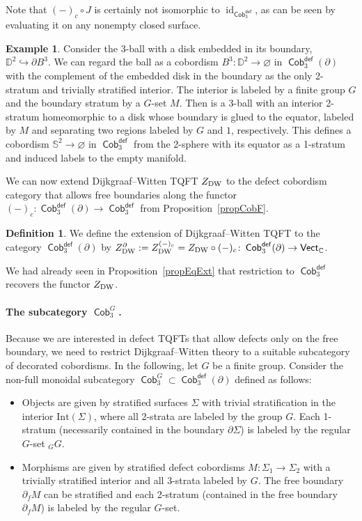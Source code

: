 \documentclass[pdftex]{sigma}
\DeclareMathOperator{\id}{id}
\DeclareMathOperator{\vect}{\mathsf{Vect}}
\DeclareMathOperator{\C}{\mathbb{C}}
\DeclareMathOperator{\Cob}{\mathsf{Cob}}
\numberwithin{equation}{section}
\theoremstyle{definition}
\newtheorem{Definition}[Definition]{Definition}
\newtheorem{Example}[Example]{Example}
\begin{document}
Note that $(-)_c \circ J$ is certainly not isomorphic to $ \id_{\Cob_3^{\mathsf{def}}}$, as can be seen by evaluating it on any nonempty closed surface.
\begin{Example}\label{exCompl}
Consider the 3-ball with a disk embedded in its boundary, $\mathbb{D}^2 \hookrightarrow \partial B^3$. We can regard the ball as a cobordism $B^3\colon \mathbb{D}^2 \rightarrow \varnothing$ in $\Cob_3^{\mathsf{def}}(\partial)$ with the complement of the embedded disk in the boundary as the only 2-stratum and trivially stratified interior. The interior is labeled by a finite group $G$ and the boundary stratum by a $G$-set $M$. Then  is a 3-ball with an interior 2-stratum homeomorphic to a disk whose boundary is glued to the equator, labeled by $M$ and separating two regions labeled by $G$ and $1$, respectively. This defines a cobordism $\mathbb{S}^2 \rightarrow \varnothing$ in $\Cob_3^{\mathsf{def}}$ from the 2-sphere with its equator as a 1-stratum and induced labels to the empty manifold.
\end{Example}

We can now extend Dijkgraaf--Witten TQFT $Z_{\rm DW}$ to the defect cobordism category that allows free boundaries along the functor $(-)_c\colon \Cob_3^{\mathsf{def}}(\partial) \rightarrow \Cob_3^{\mathsf{def}}$ from Proposition~\ref{propCobF}.
\begin{Definition}\label{defExtDW}
We define the extension of Dijkgraaf--Witten TQFT to the category $\Cob_3^{\mathsf{def}}(\partial)$ by $Z_{\rm DW}^{\partial} := Z_{\rm DW}^{(-)_c} = Z_{\rm DW} \circ (-)_c\colon \Cob_3^{\mathsf{def}}(\partial) \rightarrow \vect_{\C}$.
\end{Definition}

We had already seen in Proposition~\ref{propEqExt} that restriction to $\Cob_3^{\mathsf{def}}$ recovers the functor $Z_{\rm DW}$.

\paragraph{The subcategory $\Cob_3^G$.} Because we are interested in defect TQFTs that allow defects only on the free boundary, we need to restrict Dijkgraaf--Witten theory to a suitable subcategory of decorated cobordisms. In the following, let $G$ be a finite group. Consider the non-full monoidal subcategory $\Cob_3^G \subset \Cob_3^{\mathsf{def}}(\partial)$ defined as follows:
\begin{itemize}\itemsep=0pt
 \item Objects are given by stratified surfaces $\Sigma$ with trivial stratification in the interior $\mathrm{Int}(\Sigma)$, where all 2-strata are labeled by the group $G$. Each 1-stratum (necessarily contained in the boundary $\partial \Sigma$) is labeled by the regular $G$-set $_GG$.
 \item Morphisms are given by stratified defect cobordisms $M\colon \Sigma_1 \rightarrow \Sigma_2$ with a trivially stratified interior and all 3-strata labeled by $G$. The free boundary $\partial_fM$ can be stratified and each 2-stratum (contained in the free boundary $\partial_f M$) is labeled by the regular $G$-set.
\end{itemize}
\end{document}
